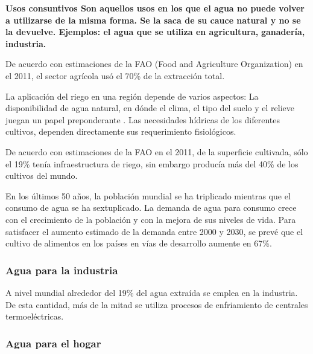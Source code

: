 \documentclass[
  a4paper,12pt]{extarticle}
\begin{document}
\textbf{Usos consuntivos Son aquellos usos en los que el agua no puede
volver} \textbf{a utilizarse de la misma forma. Se la saca de su cauce
natural y no se} \textbf{la devuelve. Ejemplos: el agua que se utiliza
en agricultura,} \textbf{ganadería, industria.}

De acuerdo con estimaciones de la FAO (Food and Agriculture
Organization) en el 2011, el sector agrícola usó el 70\% de la
extracción total.

La aplicación del riego en una región depende de varios aspectos: La
disponibilidad de agua natural, en dónde el clima, el tipo del suelo y
el relieve juegan un papel preponderante . Las necesidades hídricas de
los diferentes cultivos, dependen directamente sus requerimiento
fisiológicos.

De acuerdo con estimaciones de la FAO en el 2011, de la superficie
cultivada, sólo el 19\% tenía infraestructura de riego, sin embargo
producía más del 40\% de los cultivos del mundo.

En los últimos 50 años, la población mundial se ha triplicado mientras
que el consumo de agua se ha sextuplicado. La demanda de agua para
consumo crece con el crecimiento de la población y con la mejora de sus
niveles de vida. Para satisfacer el aumento estimado de la demanda entre
2000 y 2030, se prevé que el cultivo de alimentos en los países en vías
de desarrollo aumente en 67\%.

\hypertarget{agua-para-la-industria}{%
\subsubsection{Agua para la industria}\label{agua-para-la-industria}}

A nivel mundial alrededor del 19\% del agua extraída se emplea en la
industria. De esta cantidad, más de la mitad se utiliza procesos de
enfriamiento de centrales termoeléctricas.

\hypertarget{agua-para-el-hogar}{%
\subsubsection{Agua para el hogar}\label{agua-para-el-hogar}}
\end{document}
